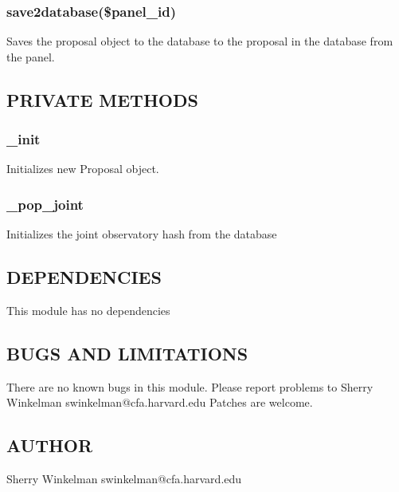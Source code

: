 \documentclass{article}
\begin{document}
\subsubsection*{save2database(\$panel\_id)\label{Proposal_save2database_panel_id_}}


Saves the proposal object to the database to the proposal in the
database from the panel.

\subsection*{PRIVATE METHODS\label{Proposal_PRIVATE_METHODS}}
\subsubsection*{\_init\label{Proposal__init}}


Initializes new Proposal object.

\subsubsection*{\_pop\_joint\label{Proposal__pop_joint}}


Initializes the joint observatory hash from the database

\subsection*{DEPENDENCIES\label{Proposal_DEPENDENCIES}}


This module has no dependencies

\subsection*{BUGS AND LIMITATIONS\label{Proposal_BUGS_AND_LIMITATIONS}}


There are no known bugs in this module.
Please report problems to Sherry Winkelman swinkelman@cfa.harvard.edu
Patches are welcome.

\subsection*{AUTHOR\label{Proposal_AUTHOR}}


Sherry Winkelman swinkelman@cfa.harvard.edu
\end{document}
